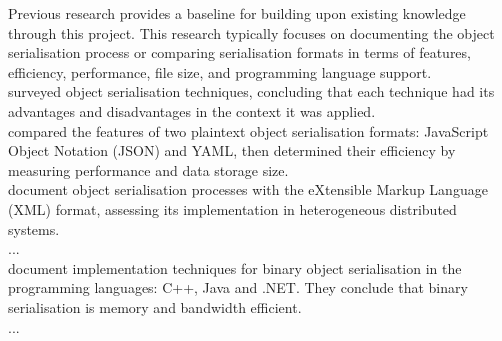 \documentclass[../report.tex]{subfiles}
\begin{document}
Previous research provides a baseline for building upon existing knowledge through this project. This research typically focuses on documenting the object serialisation process or comparing serialisation formats in terms of features, efficiency, performance, file size, and programming language support. \\

\cite{kazuaki2011survey} surveyed object serialisation techniques, concluding that each technique had its advantages and disadvantages in the context it was applied. \\

\cite{eriksson2011comparison} compared the features of two plaintext object serialisation formats: JavaScript Object Notation (JSON) and YAML, then determined their efficiency by measuring performance and data storage size. \\

\cite{goff2001xmlserialization} document object serialisation processes with the eXtensible Markup Language (XML) format, assessing its implementation in heterogeneous distributed systems. \\

\cite{sumaray2012efficiency} ... \\

\cite{tauro2012binary} document implementation techniques for binary object serialisation in the programming languages: C++, Java and .NET. They conclude that binary serialisation is memory and bandwidth efficient. \\

\cite{vanura2018performance} ...
\end{document}
